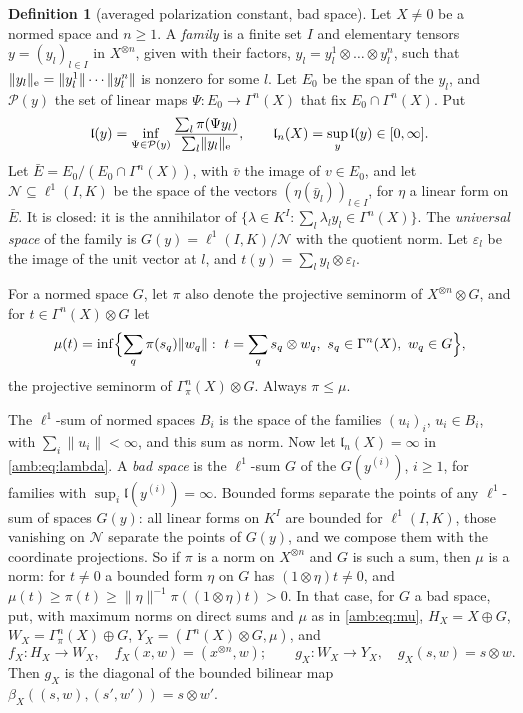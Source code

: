 \documentclass[11pt]{amsart}
\theoremstyle{definition}
\newtheorem{definition}[theorem]{Definition}
\theoremstyle{remark}
\numberwithin{equation}{section}
\newcommand{\norm}[1]{\lVert #1\rVert}
\theoremstyle{plain}
\theoremstyle{definition}
\theoremstyle{plain}
\begin{document}
\begin{definition}[averaged polarization constant, bad space]\label{amb:def:polarization}
Let $X\ne0$ be a normed space and $n\ge1$. A \emph{family} is a finite set $I$ and elementary tensors $y=(y_l)_{l\in I}$ in $X^{\otimes n}$, given with their factors, $y_l=y_l^1\otimes\dots\otimes y_l^n$, such that $\norm{y_l}_{\rm e}=\norm{y_l^1}\cdots\norm{y_l^n}$ is nonzero for some $l$. Let $E_0$ be the span of the $y_l$, and $\mathcal P(y)$ the set of linear maps $\Psi\colon E_0\to\Gamma^n(X)$ that fix $E_0\cap\Gamma^n(X)$. Put
\begin{equation}\label{amb:eq:lambda}
 \mathfrak l(y)=\inf_{\Psi\in\mathcal P(y)}\frac{\sum_l\pi(\Psi y_l)}{\sum_l\norm{y_l}_{\rm e}},\qquad
 \mathfrak l_n(X)=\sup_y\mathfrak l(y)\in[0,\infty].
\end{equation}
Let $\bar E=E_0/(E_0\cap\Gamma^n(X))$, with $\bar v$ the image of $v\in E_0$, and let $\mathcal N\subseteq\ell^1(I,K)$ be the space of the vectors $(\eta(\bar y_l))_{l\in I}$, for $\eta$ a linear form on $\bar E$. It is closed: it is the annihilator of $\{\lambda\in K^I:\sum_l\lambda_ly_l\in\Gamma^n(X)\}$. The \emph{universal space} of the family is $G(y)=\ell^1(I,K)/\mathcal N$ with the quotient norm. Let $\varepsilon_l$ be the image of the unit vector at $l$, and $t(y)=\sum_ly_l\otimes\varepsilon_l$.

For a normed space $G$, let $\pi$ also denote the projective seminorm of $X^{\otimes n}\otimes G$, and for $t\in\Gamma^n(X)\otimes G$ let
\begin{equation}\label{amb:eq:mu}
 \mu(t)=\inf\Bigl\{\sum_q\pi(s_q)\norm{w_q}:\ t=\sum_qs_q\otimes w_q,\ s_q\in\Gamma^n(X),\ w_q\in G\Bigr\},
\end{equation}
the projective seminorm of $\Gamma^n_\pi(X)\otimes G$. Always $\pi\le\mu$.

The $\ell^1$-sum of normed spaces $B_i$ is the space of the families $(u_i)_i$, $u_i\in B_i$, with $\sum_i\norm{u_i}<\infty$, and this sum as norm. Now let $\mathfrak l_n(X)=\infty$ in \eqref{amb:eq:lambda}. A \emph{bad space} is the $\ell^1$-sum $G$ of the $G(y^{(i)})$, $i\ge1$, for families with $\sup_i\mathfrak l(y^{(i)})=\infty$. Bounded forms separate the points of any $\ell^1$-sum of spaces $G(y)$: all linear forms on $K^I$ are bounded for $\ell^1(I,K)$, those vanishing on $\mathcal N$ separate the points of $G(y)$, and we compose them with the coordinate projections. So if $\pi$ is a norm on $X^{\otimes n}$ and $G$ is such a sum, then $\mu$ is a norm: for $t\ne0$ a bounded form $\eta$ on $G$ has $(1\otimes\eta)t\ne0$, and $\mu(t)\ge\pi(t)\ge\norm\eta^{-1}\pi((1\otimes\eta)t)>0$. In that case, for $G$ a bad space, put, with maximum norms on direct sums and $\mu$ as in \eqref{amb:eq:mu}, $H_X=X\oplus G$, $W_X=\Gamma^n_\pi(X)\oplus G$, $Y_X=(\Gamma^n(X)\otimes G,\mu)$, and
\begin{equation}\label{amb:b:maps}
 f_X\colon H_X\to W_X,\quad f_X(x,w)=(x^{\otimes n},w);\qquad
 g_X\colon W_X\to Y_X,\quad g_X(s,w)=s\otimes w.
\end{equation}
Then $g_X$ is the diagonal of the bounded bilinear map $\beta_X((s,w),(s',w'))=s\otimes w'$.
\end{definition}
\end{document}
